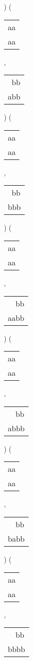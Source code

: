 ) 
 ( 
\begin{tabular}{|l|} \hline
aa \\
aa \\
\hline
\end{tabular} 
 , 
\begin{tabular}{|l|} \hline
\ bb \\
abb \\
\hline
\end{tabular} 
) 
 ( 
\begin{tabular}{|l|} \hline
aa \\
aa \\
\hline
\end{tabular} 
 , 
\begin{tabular}{|l|} \hline
\ bb \\
bbb \\
\hline
\end{tabular} 
) 
 ( 
\begin{tabular}{|l|} \hline
aa \\
aa \\
\hline
\end{tabular} 
 , 
\begin{tabular}{|l|} \hline
\ \ bb \\
aabb \\
\hline
\end{tabular} 
) 
 ( 
\begin{tabular}{|l|} \hline
aa \\
aa \\
\hline
\end{tabular} 
 , 
\begin{tabular}{|l|} \hline
\ \ bb \\
abbb \\
\hline
\end{tabular} 
) 
 ( 
\begin{tabular}{|l|} \hline
aa \\
aa \\
\hline
\end{tabular} 
 , 
\begin{tabular}{|l|} \hline
\ \ bb \\
babb \\
\hline
\end{tabular} 
) 
 ( 
\begin{tabular}{|l|} \hline
aa \\
aa \\
\hline
\end{tabular} 
 , 
\begin{tabular}{|l|} \hline
\ \ bb \\
bbbb \\
\hline
\end{tabular} 
